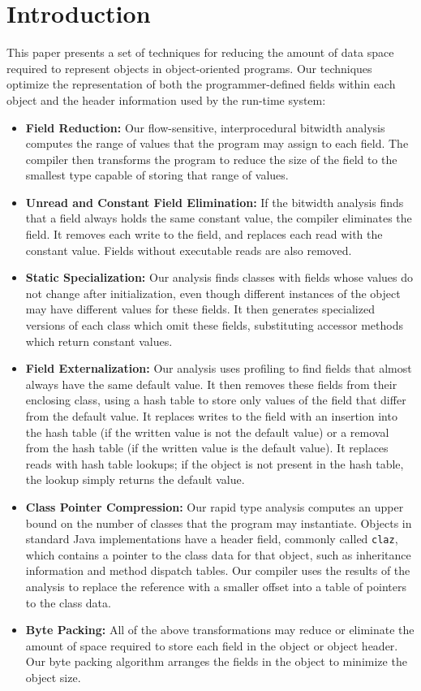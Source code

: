 \documentclass{acmconf}
\begin{document}
\section{Introduction}
%
This paper presents a set of techniques for reducing the
amount of data space required to represent objects
in object-oriented programs. Our techniques optimize
the representation of both the programmer-defined fields
within each object and the header information used by the
run-time system:
\begin{itemize}
\item {\bf Field Reduction:} 
Our flow-sensitive, interprocedural bitwidth analysis
computes the range of values that the program
may assign to each field. The compiler then transforms the program
to reduce the size of the field to the smallest type
capable of storing that range of values. 
\item {\bf Unread and Constant Field Elimination:} 
If the bitwidth analysis finds that a field always holds
the same constant value, the compiler eliminates the field. 
It removes each write to the field, and replaces each read
with the constant value.  Fields without executable reads are
also removed.
\item {\bf Static Specialization:} Our analysis finds 
classes with fields whose values do not change after initialization,
even though different instances of the object may
have different values for these fields. It then generates 
specialized versions of each class which omit these fields,
substituting accessor methods which return constant values.
\item {\bf Field Externalization:} Our analysis uses profiling
to find fields that almost always have the same default value. 
It then removes these fields from their enclosing class, 
using a hash table to store only values of the field that differ
from the default value. It replaces writes to the field with
an insertion into the hash table (if the written value is not the
default value) or a removal from the hash table (if the written value
is the default value). It replaces reads with hash table lookups; 
if the object is not present in the hash table, the lookup simply
returns the default value. 
\item {\bf Class Pointer Compression:} Our rapid type analysis
computes an upper bound on the number of classes that the
program may instantiate. Objects in standard 
Java implementations have a header field, commonly called {\tt claz},
which contains a pointer
to the class data for that object,
such as inheritance information and method dispatch tables.
Our compiler uses the results of the 
analysis to replace the reference with a smaller
offset into a table of pointers to the class data. 
\item {\bf Byte Packing:} All of the above transformations may
reduce or eliminate the amount of space required to store each
field in the object or object header. Our byte packing algorithm
arranges the fields in the object to minimize the object size.
\end{itemize}
\end{document}
